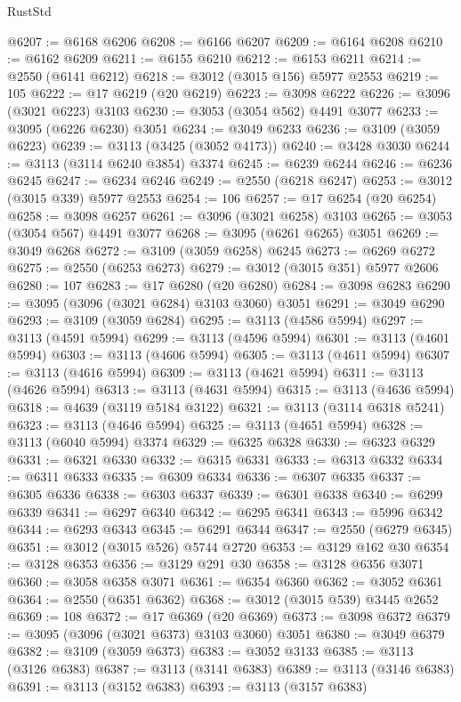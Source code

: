 \begin{lexlean}{RustStd}
\begin{coremodule}
@6207 := @6168 @6206
@6208 := @6166 @6207
@6209 := @6164 @6208
@6210 := @6162 @6209
@6211 := @6155 @6210
@6212 := @6153 @6211
@6214 := @2550 (@6141 @6212)
@6218 := @3012 (@3015 @156) @5977 @2553
@6219 := 105
@6222 := @17 @6219 (@20 @6219)
@6223 := @3098 @6222
@6226 := @3096 (@3021 @6223) @3103
@6230 := @3053 (@3054 @562) @4491 @3077
@6233 := @3095 (@6226 @6230) @3051
@6234 := @3049 @6233
@6236 := @3109 (@3059 @6223)
@6239 := @3113 (@3425 (@3052 @4173))
@6240 := @3428 @3030
@6244 := @3113 (@3114 @6240 @3854) @3374
@6245 := @6239 @6244
@6246 := @6236 @6245
@6247 := @6234 @6246
@6249 := @2550 (@6218 @6247)
@6253 := @3012 (@3015 @339) @5977 @2553
@6254 := 106
@6257 := @17 @6254 (@20 @6254)
@6258 := @3098 @6257
@6261 := @3096 (@3021 @6258) @3103
@6265 := @3053 (@3054 @567) @4491 @3077
@6268 := @3095 (@6261 @6265) @3051
@6269 := @3049 @6268
@6272 := @3109 (@3059 @6258) @6245
@6273 := @6269 @6272
@6275 := @2550 (@6253 @6273)
@6279 := @3012 (@3015 @351) @5977 @2606
@6280 := 107
@6283 := @17 @6280 (@20 @6280)
@6284 := @3098 @6283
@6290 := @3095 (@3096 (@3021 @6284) @3103 @3060) @3051
@6291 := @3049 @6290
@6293 := @3109 (@3059 @6284)
@6295 := @3113 (@4586 @5994)
@6297 := @3113 (@4591 @5994)
@6299 := @3113 (@4596 @5994)
@6301 := @3113 (@4601 @5994)
@6303 := @3113 (@4606 @5994)
@6305 := @3113 (@4611 @5994)
@6307 := @3113 (@4616 @5994)
@6309 := @3113 (@4621 @5994)
@6311 := @3113 (@4626 @5994)
@6313 := @3113 (@4631 @5994)
@6315 := @3113 (@4636 @5994)
@6318 := @4639 (@3119 @5184 @3122)
@6321 := @3113 (@3114 @6318 @5241)
@6323 := @3113 (@4646 @5994)
@6325 := @3113 (@4651 @5994)
@6328 := @3113 (@6040 @5994) @3374
@6329 := @6325 @6328
@6330 := @6323 @6329
@6331 := @6321 @6330
@6332 := @6315 @6331
@6333 := @6313 @6332
@6334 := @6311 @6333
@6335 := @6309 @6334
@6336 := @6307 @6335
@6337 := @6305 @6336
@6338 := @6303 @6337
@6339 := @6301 @6338
@6340 := @6299 @6339
@6341 := @6297 @6340
@6342 := @6295 @6341
@6343 := @5996 @6342
@6344 := @6293 @6343
@6345 := @6291 @6344
@6347 := @2550 (@6279 @6345)
@6351 := @3012 (@3015 @526) @5744 @2720
@6353 := @3129 @162 @30
@6354 := @3128 @6353
@6356 := @3129 @291 @30
@6358 := @3128 @6356 @3071
@6360 := @3058 @6358 @3071
@6361 := @6354 @6360
@6362 := @3052 @6361
@6364 := @2550 (@6351 @6362)
@6368 := @3012 (@3015 @539) @3445 @2652
@6369 := 108
@6372 := @17 @6369 (@20 @6369)
@6373 := @3098 @6372
@6379 := @3095 (@3096 (@3021 @6373) @3103 @3060) @3051
@6380 := @3049 @6379
@6382 := @3109 (@3059 @6373)
@6383 := @3052 @3133
@6385 := @3113 (@3126 @6383)
@6387 := @3113 (@3141 @6383)
@6389 := @3113 (@3146 @6383)
@6391 := @3113 (@3152 @6383)
@6393 := @3113 (@3157 @6383)

\end{coremodule}
\end{lexlean}

